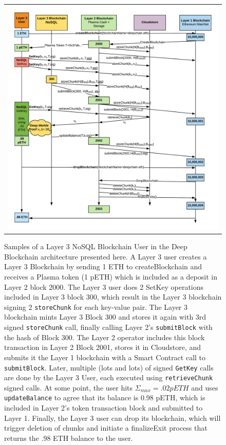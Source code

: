 \documentclass{article}
\begin{document}
\begin{figure}
\begin{tabular}{c}
\centerline{\includegraphics[width=17.5cm]{StateChannel.png}} \\
\end{tabular}
\caption{\small Samples of a Layer 3 NoSQL Blockchain User in the Deep Blockchain architecture presented here.  A Layer 3 user creates a Layer 3 Blockchain by sending 1 ETH to createBlockchain and receives a Plasma token (1 pETH) which is included as a deposit in Layer 2 block 2000.  The Layer 3 user does 2 SetKey operations included in Layer 3 block 300, which result in the Layer 3 blockchain signing 2 \texttt{storeChunk} for each key-value pair.  The Layer 3 blockchain mints Layer 3 Block 300 and stores it again with 3rd signed \texttt{storeChunk} call, finally calling Layer 2's \texttt{submitBlock} with the hash of Block 300.  The Layer 2 operator includes this block transaction in Layer 2 Block 2001, stores it in Cloudstore, and submits it the Layer 1 blockchain with a Smart Contract call to \texttt{submitBlock}.  Later, multiple (lots and lots)  of signed  \texttt{GetKey} calls are done by the Layer 3 User, each executed using \texttt{retrieveChunk} signed calls.  At some point, the user hits $\Sigma_{max}=.02 pETH$ and uses \texttt{updateBalance} to agree that its balance is 0.98 pETH, which is included in Layer 2's token transaction block and submitted to Layer 1.  Finally, the Layer 3 user can drop its blockchain, which will trigger deletion of chunks and initiate a finalizeExit process that returns the .98 ETH balance to the user.}
\centering
\label{statechannel}
\end{figure}
\end{document}
